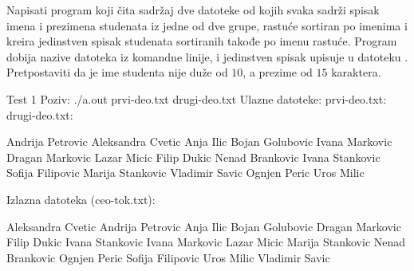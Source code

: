 \begin{Answer}[ref=505]
\end{Answer}
\begin{Exercise}[label=506]
  Napisati program koji čita sadržaj dve datoteke od kojih svaka
  sadrži spisak imena i prezimena studenata iz jedne od dve grupe,
  rastuće sortiran po imenima i kreira jedinstven spisak studenata
  sortiranih takođe po imenu rastuće.  Program dobija nazive datoteka
  iz komandne linije, i jedinstven spisak upisuje u datoteku
  . Pretpostaviti da je ime studenta nije duže od
  $10$, a prezime od $15$ karaktera.


\begin{maxitest}
\begin{test}{Test 1}
Poziv: ./a.out prvi-deo.txt drugi-deo.txt
Ulazne datoteke:
  prvi-deo.txt:          drugi-deo.txt:

  Andrija Petrovic       Aleksandra Cvetic
  Anja Ilic              Bojan Golubovic
  Ivana Markovic         Dragan Markovic
  Lazar Micic            Filip Dukic
  Nenad Brankovic        Ivana Stankovic
  Sofija Filipovic       Marija Stankovic
  Vladimir Savic         Ognjen Peric
  Uros Milic

Izlazna datoteka (ceo-tok.txt):
  
  Aleksandra Cvetic
  Andrija Petrovic
  Anja Ilic
  Bojan Golubovic
  Dragan Markovic
  Filip Dukic
  Ivana Stankovic
  Ivana Markovic
  Lazar Micic
  Marija Stankovic
  Nenad Brankovic
  Ognjen Peric
  Sofija Filipovic
  Uros Milic
  Vladimir Savic
\end{test}
\end{maxitest}
  
\end{Exercise}

